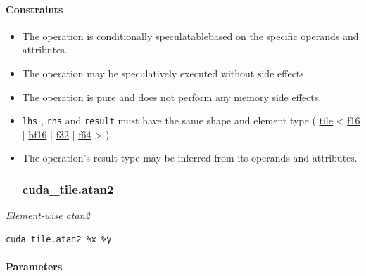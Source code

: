 \documentclass{article}
\begin{document}
\paragraph{Constraints}

\begin{itemize}
\item The operation is conditionally speculatablebased on the specific operands and attributes.
\item The operation may be speculatively executed without side effects.
\item The operation is pure and does not perform any memory side effects.
\item \texttt{lhs} , \texttt{rhs} and \texttt{result} must have the same shape and element type ( \href{https://docs.nvidia.com/cuda/tile-ir/latest/sections/types.html#type-tile}{tile} < \href{https://docs.nvidia.com/cuda/tile-ir/latest/sections/types.html#subsection-element-types}{f16} | \href{https://docs.nvidia.com/cuda/tile-ir/latest/sections/types.html#subsection-element-types}{bf16} | \href{https://docs.nvidia.com/cuda/tile-ir/latest/sections/types.html#subsection-element-types}{f32} | \href{https://docs.nvidia.com/cuda/tile-ir/latest/sections/types.html#subsection-element-types}{f64} > ).
\item The operation's result type may be inferred from its operands and attributes.


\subsubsection{cuda\_tile.atan2}

\end{itemize}
\textit{Element-wise atan2}


\begin{lstlisting}
cuda_tile.atan2 %x %y
\end{lstlisting}

\paragraph{Parameters}
\end{document}
